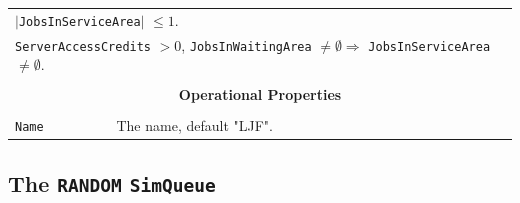 \documentclass[12pt]{book}
\begin{document}
\begin{tabular}{|l|l|l|l|}
\multicolumn{4}{|l|}{$|$\lstinline|JobsInServiceArea|$|$ $\leq 1$.} \\
\multicolumn{4}{|l|}{\lstinline|ServerAccessCredits| $> 0$, \lstinline|JobsInWaitingArea| $\neq \emptyset
                     \Rightarrow$ \lstinline|JobsInServiceArea| $\neq \emptyset$.} \\
\hline
\multicolumn{4}{|c|}{} \\
\multicolumn{4}{|c|}{\bf Operational Properties} \\
\multicolumn{4}{|c|}{} \\
\hline
\lstinline|Name| & \multicolumn{3}{|l|}{The name, default "LJF".} \\
\hline
\end{tabular}

\subsection{The \lstinline{RANDOM} \lstinline{SimQueue}}
\label{sec:RANDOM}
\end{document}
